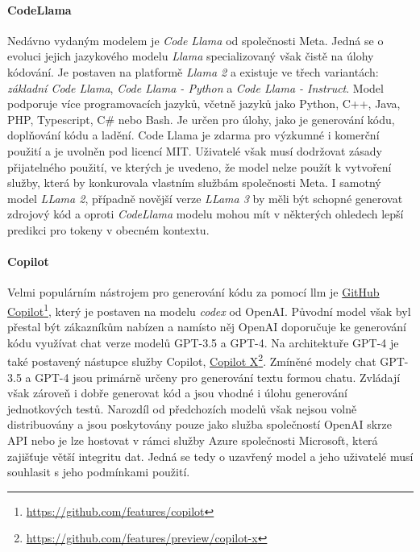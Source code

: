 \documentclass[czech, ma, kiv, he, iso690alph, pdf, viewonly]{fasthesis}
\begin{document}
    \paragraph{CodeLlama} Nedávno vydaným modelem je \textit{Code Llama} od společnosti Meta. Jedná se o evoluci jejich jazykového modelu \textit{Llama} specializovaný však čistě na úlohy kódování. Je postaven na platformě \textit{Llama 2} a existuje ve třech variantách: \textit{základní Code Llama}, \textit{Code Llama - Python} a \textit{Code Llama - Instruct}. Model podporuje více programovacích jazyků, včetně jazyků jako Python, C++, Java, PHP, Typescript, C# nebo Bash. Je určen pro úlohy, jako je generování kódu, doplňování kódu a ladění. Code Llama je zdarma pro výzkumné i komerční použití a je uvolněn pod licencí MIT. Uživatelé však musí dodržovat  zásady přijatelného použití, ve kterých je uvedeno, že model nelze použít k vytvoření služby, která by konkurovala vlastním službám společnosti Meta. \cite{roziere2024code} I samotný model \textit{LLama 2}, případně novější verze \textit{LLama 3} by měli být schopné generovat zdrojový kód a oproti \textit{CodeLlama} modelu mohou mít v některých ohledech lepší predikci pro tokeny v obecném kontextu. \cite{metallama3introduction}

    \paragraph{Copilot} Velmi populárním nástrojem pro generování kódu za pomocí \gls{llm} je \href{https://github.com/features/copilot}{GitHub Copilot}\footnote{\url{https://github.com/features/copilot}}, který je postaven na modelu \textit{codex} od OpenAI. Původní model však byl přestal být zákazníkům nabízen a namísto něj OpenAI doporučuje ke generování kódu využívat chat verze modelů GPT-3.5 a GPT-4. Na architektuře GPT-4 je také postavený nástupce služby Copilot, \href{https://github.com/features/preview/copilot-x}{Copilot X}\footnote{\url{https://github.com/features/preview/copilot-x}}. Zmíněné modely chat GPT-3.5 a GPT-4 jsou primárně určeny pro generování textu formou chatu. Zvládají však zároveň i dobře generovat kód a jsou vhodné i úlohu generování jednotkových testů. \cite{openai2024gpt4} Narozdíl od předchozích modelů však nejsou volně distribuovány a jsou poskytovány pouze jako služba společností OpenAI skrze API nebo je lze hostovat v rámci služby Azure společnosti Microsoft, která zajišťuje větší integritu dat. Jedná se tedy o uzavřený model a jeho uživatelé musí souhlasit s jeho podmínkami použití.
\end{document}
